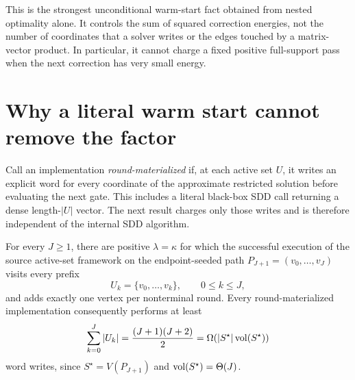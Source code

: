 \documentclass[11pt]{article}
\begin{document}
This is the strongest unconditional warm-start fact obtained from nested
optimality alone.  It controls the sum of squared correction energies, not
the number of coordinates that a solver writes or the edges touched by a
matrix-vector product.  In particular, it cannot charge a fixed positive
full-support pass when the next correction has very small energy.

\section{Why a literal warm start cannot remove the factor}
\label{sec:materialization}

Call an implementation \emph{round-materialized} if, at each active set $U$,
it writes an explicit word for every coordinate of the approximate restricted
solution before evaluating the next gate.  This includes a literal black-box
SDD call returning a dense length-$|U|$ vector.  The next result charges only
those writes and is therefore independent of the internal SDD algorithm.

\begin{theorem}
\label{thm:path-materialization}
For every $J\geq1$, there are positive $\lambda=\kappa$ for which the
successful execution of the source active-set framework on the endpoint-seeded
path $P_{J+1}=(v_0,\ldots,v_J)$ visits every prefix
\begin{equation}
 U_k=\{v_0,\ldots,v_k\},\qquad 0\leq k\leq J,
 \label{eq:path-prefixes}
\end{equation}
and adds exactly one vertex per nonterminal round.  Every round-materialized
implementation consequently performs at least
\begin{equation}
 \sum_{k=0}^{J}|U_k|=\frac{(J+1)(J+2)}2
 =\Omega(|S^\star|\operatorname{vol}(S^\star))
 \label{eq:write-lower}
\end{equation}
word writes, since $S^\star=V(P_{J+1})$ and
$\operatorname{vol}(S^\star)=\Theta(J)$.
\end{theorem}
\end{document}

